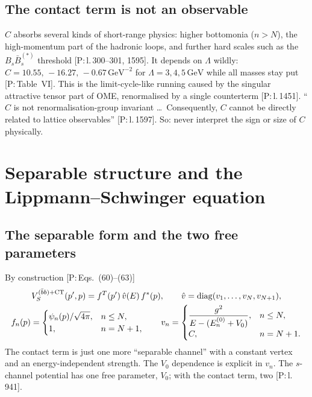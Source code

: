 \documentclass[11pt,a4paper]{article}
\newcommand{\tagP}[1]{\textcolor{blue!65!black}{\textsf{\small[P:\,#1]}}}
\renewcommand{\GeV}{\,\mathrm{GeV}}
\begin{document}
\subsection{The contact term is not an observable}

$C$ absorbs several kinds of short-range physics: higher bottomonia ($n>N$), the high-momentum part of the hadronic loops, and further hard scales such as the $B_s\bar B_s^{(*)}$ threshold \tagP{l.\,300--301, 1595}. It depends on $\Lambda$ wildly: $C=10.55,\,-16.27,\,-0.67\GeV^{-2}$ for $\Lambda=3,4,5\GeV$ while all masses stay put \tagP{Table~VI}. This is the limit-cycle-like running caused by the singular attractive tensor part of OME, renormalised by a single counterterm \tagP{l.\,1451}. ``$C$ is not renormalisation-group invariant \dots\ Consequently, $C$ cannot be directly related to lattice observables'' \tagP{l.\,1597}. So: never interpret the sign or size of $C$ physically.

\section{Separable structure and the Lippmann--Schwinger equation}
\label{sec:lse}

\subsection{The separable form and the two free parameters}

By construction \tagP{Eqs.~(60)--(63)}
\begin{gather}
V_S^{(\bar bb)+{\rm CT}}(p',p)=f^T(p')\,\hat v(E)\,f^*(p),\qquad \hat v={\rm diag}(v_1,\dots,v_N,v_{N+1}),\\
f_n(p)=\begin{cases}\psi_n(p)/\sqrt{4\pi},&n\le N,\\ 1,&n=N+1,\end{cases}\qquad
v_n=\begin{cases}\dfrac{g^2}{E-(E_n^{(0)}+V_0)},&n\le N,\\[2mm] C,&n=N+1.\end{cases}
\end{gather}
The contact term is just one more ``separable channel'' with a constant vertex and an energy-independent strength. The $V_0$ dependence is explicit in $v_n$. The $s$-channel potential has one free parameter, $V_0$; with the contact term, two \tagP{l.\,941}.
\end{document}
